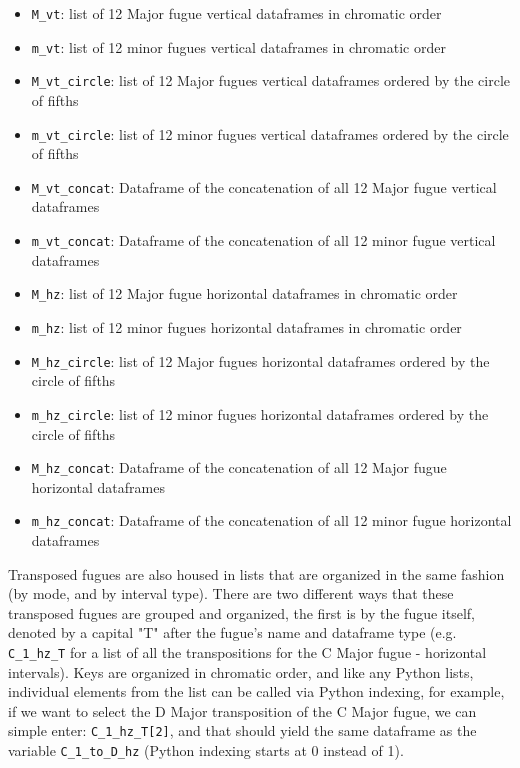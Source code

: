 \begin{itemize}
\tightlist
\item
  \texttt{M\_vt}: list of 12 Major fugue vertical dataframes in
  chromatic order
\item
  \texttt{m\_vt}: list of 12 minor fugues vertical dataframes in
  chromatic order
\item
  \texttt{M\_vt\_circle}: list of 12 Major fugues vertical dataframes
  ordered by the circle of fifths
\item
  \texttt{m\_vt\_circle}: list of 12 minor fugues vertical dataframes
  ordered by the circle of fifths
\item
  \texttt{M\_vt\_concat}: Dataframe of the concatenation of all 12 Major
  fugue vertical dataframes
\item
  \texttt{m\_vt\_concat}: Dataframe of the concatenation of all 12 minor
  fugue vertical dataframes 
\item
  \texttt{M\_hz}: list of 12 Major fugue horizontal dataframes in
  chromatic order
\item
  \texttt{m\_hz}: list of 12 minor fugues horizontal dataframes in
  chromatic order
\item
  \texttt{M\_hz\_circle}: list of 12 Major fugues horizontal dataframes
  ordered by the circle of fifths
\item
  \texttt{m\_hz\_circle}: list of 12 minor fugues horizontal dataframes
  ordered by the circle of fifths
\item
  \texttt{M\_hz\_concat}: Dataframe of the concatenation of all 12 Major
  fugue horizontal dataframes
\item
  \texttt{m\_hz\_concat}: Dataframe of the concatenation of all 12 minor
  fugue horizontal dataframes
\end{itemize}

Transposed fugues are also housed in lists that are organized in the
same fashion (by mode, and by interval type). There are two different
ways that these transposed fugues are grouped and organized, the first
is by the fugue itself, denoted by a capital "T" after the fugue's name
and dataframe type (e.g. \texttt{C\_1\_hz\_T} for a list of all the
transpositions for the C Major fugue - horizontal intervals). Keys are
organized in chromatic order, and like any Python lists, individual
elements from the list can be called via Python indexing, for example,
if we want to select the D Major transposition of the C Major fugue, we
can simple enter: \texttt{C\_1\_hz\_T{[}2{]}}, and that should yield the
same dataframe as the variable \texttt{C\_1\_to\_D\_hz} (Python indexing
starts at 0 instead of 1).

